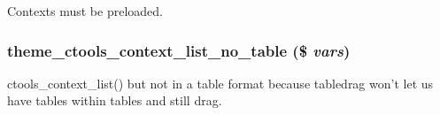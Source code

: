 Contexts must be preloaded. \hypertarget{context_8theme_8inc_a3898a3531ef6e3b88e375f5ea59dca5c}{
\subsubsection[{theme\_\-ctools\_\-context\_\-list\_\-no\_\-table}]{\setlength{\rightskip}{0pt plus 5cm}theme\_\-ctools\_\-context\_\-list\_\-no\_\-table (\$ {\em vars})}}
\label{context_8theme_8inc_a3898a3531ef6e3b88e375f5ea59dca5c}
ctools\_\-context\_\-list() but not in a table format because tabledrag won't let us have tables within tables and still drag. 